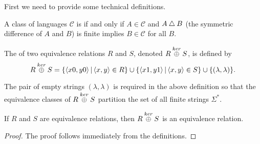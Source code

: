 First we need to provide some technical definitions.

\begin{definition}
  A class of languages $\mathcal{C}$ is  if and only if $A\in \mathcal{C}$ and $A\bigtriangleup B$ (the symmetric difference of $A$ and $B$) is finite implies $B\in \mathcal{C}$ for all $B$.
\end{definition}

\begin{definition}
  The  of two equivalence relations $R$ and $S$, denoted $R \overset{ker}{\oplus} S$, is defined by
  \begin{equation*}
    R \overset{ker}{\oplus} S = \left\{ \langle x0,y0\rangle \,\middle|\, \langle x,y\rangle \in R \right\} \cup \left\{ \langle x1,y1\rangle \,\middle|\, \langle x,y\rangle \in S \right\} \cup \{(\lambda, \lambda)\}.
  \end{equation*}
\end{definition}

The pair of empty strings $(\lambda, \lambda)$ is required in the above definition so that the equivalence classes of $R \overset{ker}{\oplus} S$ partition the set of all finite strings $\Sigma^*$.

\begin{lemma}\label{lem:join}
  If $R$ and $S$ are equivalence relations, then $R \overset{ker}{\oplus} S$ is an equivalence relation.
\end{lemma}
\begin{proof}
  The proof follows immediately from the definitions.
\end{proof}

